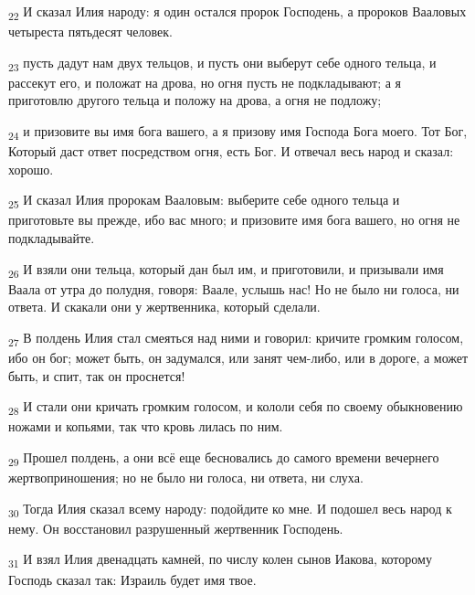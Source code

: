 \begin{tcolorbox}
\textsubscript{22} И сказал Илия народу: я один остался пророк Господень, а пророков Вааловых четыреста пятьдесят человек.
\end{tcolorbox}
\begin{tcolorbox}
\textsubscript{23} пусть дадут нам двух тельцов, и пусть они выберут себе одного тельца, и рассекут его, и положат на дрова, но огня пусть не подкладывают; а я приготовлю другого тельца и положу на дрова, а огня не подложу;
\end{tcolorbox}
\begin{tcolorbox}
\textsubscript{24} и призовите вы имя бога вашего, а я призову имя Господа Бога моего. Тот Бог, Который даст ответ посредством огня, есть Бог. И отвечал весь народ и сказал: хорошо.
\end{tcolorbox}
\begin{tcolorbox}
\textsubscript{25} И сказал Илия пророкам Вааловым: выберите себе одного тельца и приготовьте вы прежде, ибо вас много; и призовите имя бога вашего, но огня не подкладывайте.
\end{tcolorbox}
\begin{tcolorbox}
\textsubscript{26} И взяли они тельца, который дан был им, и приготовили, и призывали имя Ваала от утра до полудня, говоря: Ваале, услышь нас! Но не было ни голоса, ни ответа. И скакали они у жертвенника, который сделали.
\end{tcolorbox}
\begin{tcolorbox}
\textsubscript{27} В полдень Илия стал смеяться над ними и говорил: кричите громким голосом, ибо он бог; может быть, он задумался, или занят чем-либо, или в дороге, а может быть, и спит, так он проснется!
\end{tcolorbox}
\begin{tcolorbox}
\textsubscript{28} И стали они кричать громким голосом, и кололи себя по своему обыкновению ножами и копьями, так что кровь лилась по ним.
\end{tcolorbox}
\begin{tcolorbox}
\textsubscript{29} Прошел полдень, а они всё еще бесновались до самого времени вечернего жертвоприношения; но не было ни голоса, ни ответа, ни слуха.
\end{tcolorbox}
\begin{tcolorbox}
\textsubscript{30} Тогда Илия сказал всему народу: подойдите ко мне. И подошел весь народ к нему. Он восстановил разрушенный жертвенник Господень.
\end{tcolorbox}
\begin{tcolorbox}
\textsubscript{31} И взял Илия двенадцать камней, по числу колен сынов Иакова, которому Господь сказал так: Израиль будет имя твое.
\end{tcolorbox}
